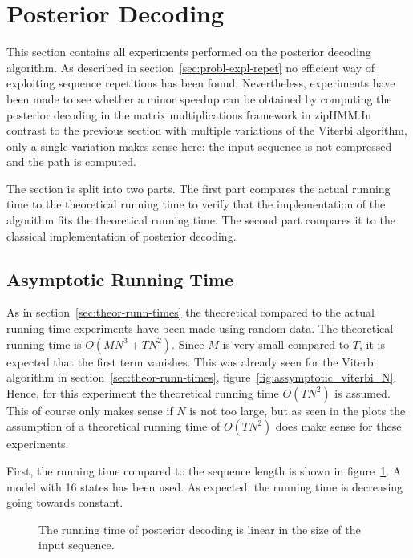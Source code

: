 \section{Posterior Decoding}

This section contains all experiments performed on the posterior decoding
algorithm. As described in section~\ref{sec:probl-expl-repet} no efficient way
of exploiting sequence repetitions has been found. Nevertheless, experiments
have been made to see whether a minor speedup can be obtained by computing the
posterior decoding in the matrix multiplications framework in zipHMM.\@ In
contrast to the previous section with multiple variations of the Viterbi
algorithm, only a single variation makes sense here: the input sequence is not
compressed and the path is computed.

The section is split into two parts. The first part compares the actual running
time to the theoretical running time to verify that the implementation of the
algorithm fits the theoretical running time. The second part compares it to the
classical implementation of posterior decoding.

\subsection{Asymptotic Running Time}
\label{sec:asympt-runn-time}

As in section~\ref{sec:theor-runn-times} the theoretical compared to the actual
running time experiments have been made using random data. The theoretical
running time is $O(M N^3 + TN^2)$. Since $M$ is very small compared to $T$, it
is expected that the first term vanishes. This was already seen for the Viterbi
algorithm in section~\ref{sec:theor-runn-times},
figure~\ref{fig:assymptotic_viterbi_N}. Hence, for this experiment the
theoretical running time $O(TN^2)$ is assumed. This of course only makes sense
if $N$ is not too large, but as seen in the plots the assumption of a
theoretical running time of $O(TN^2)$ does make sense for these experiments.

First, the running time compared to the sequence length is shown in
figure~\ref{fig:posterior_T}. A model with 16 states has been used. As expected,
the running time is decreasing going towards constant.

\begin{figure}
  \centering
  
  \caption{The running time of posterior decoding is linear in the size of the
    input sequence.}
  \label{fig:posterior_T}
\end{figure}

